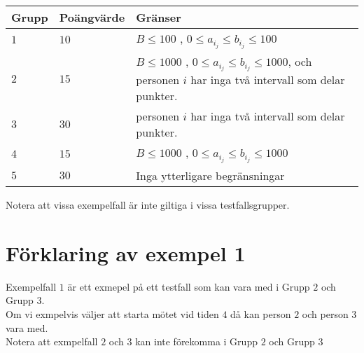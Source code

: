 \documentclass[a4paper,12pt,oneside]{amsbook}
\theoremstyle{test}
\begin{document}
\noindent
\begin{tabular}{| l | l | l |}
  \hline
  Grupp & Poängvärde & Gränser \\ \hline
  $1$   & $10$        & $B \leq 100$ , $0 \leq a_i_j \leq b_i_j  \leq 100$ \\ \hline
  $2$   & $15$       & $B \leq  1000$ , $0 \leq a_i_j \leq b_i_j  \leq 1000$, och personen $i$ har inga två intervall som delar punkter. \\ \hline
  $3$   & $30$       & personen $i$ har inga två intervall som delar punkter. \\ \hline
  $4$   & $15$       & $B \leq 1000$ , $0 \leq a_i_j \leq b_i_j  \leq 1000$ \\ \hline
  $5$   & $30$       & Inga ytterligare begränsningar \\ \hline
\end{tabular}
Notera att vissa exempelfall är inte giltiga i vissa testfallsgrupper.

\section*{Förklaring av exempel 1}
Exempelfall $1$ är ett exmepel på ett testfall som kan vara med i Grupp $2$ och Grupp $3$.\\ Om vi exmpelvis väljer att starta mötet vid tiden $4$ då kan person $2$ och person $3$ vara med.\\ Notera att exmpelfall $2$ och $3$ kan inte förekomma i Grupp $2$ och Grupp $3$
\end{document}
